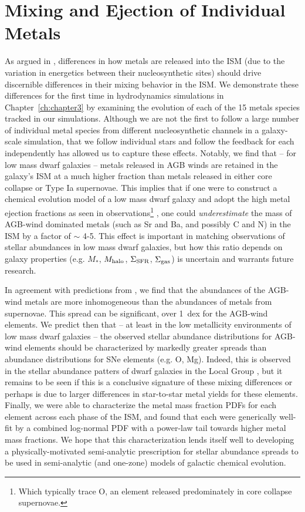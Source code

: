 \section{Mixing and Ejection of Individual Metals}
\label{conclusion:sec:ch3}

As argued in \cite{KrumholzTing2018}, differences in how metals are released into the ISM (due to the variation in energetics between their nucleosynthetic sites) should drive discernible differences in their mixing behavior in the ISM. We demonstrate these differences for the first time in hydrodynamics simulations in Chapter~\ref{ch:chapter3} by examining the evolution of each of the 15 metals species tracked in our simulations. Although we are not the first to follow a large number of individual metal species from different nucleosynthetic channels in a galaxy-scale simulation, that we follow individual stars and follow the feedback for each independently has allowed us to capture these effects. Notably, we find that -- for low mass dwarf galaxies -- metals released in AGB winds are retained in the galaxy's ISM at a much higher fraction than metals released in either core collapse or Type Ia supernovae. This implies that if one were to construct a chemical evolution model of a low mass dwarf galaxy and adopt the high metal ejection fractions as seen in observations\footnote{Which typically trace O, an element released predominately in core collapse supernovae.} \citep{Kirby2011-metals,McQuinn2015}, one could \textit{underestimate} the mass of AGB-wind dominated metals (such as Sr and Ba, and possibly C and N) in the ISM by a factor of $\sim$ 4-5. This effect is important in matching observations of stellar abundances in low mass dwarf galaxies, but how this ratio depends on galaxy properties (e.g. $M_*$, $M_{\rm halo}$, $\Sigma_{\rm SFR}$, $\Sigma_{\rm gas}$) is uncertain and warrants future research.

In agreement with predictions from \cite{KrumholzTing2018}, we find that the abundances of the AGB-wind metals are more inhomogeneous than the abundances of metals from supernovae. This spread can be significant, over 1~dex for the AGB-wind elements. We predict then that -- at least in the low metallicity environments of low mass dwarf galaxies -- the observed stellar abundance distributions for AGB-wind elements should be characterized by markedly greater spreads than abundance distributions for SNe elements (e.g. O, Mg). Indeed, this is observed in the stellar abundance patters of dwarf galaxies in the Local Group \citep{Suda2017}, but it remains to be seen if this is a conclusive signature of these mixing differences or perhaps is due to larger differences in star-to-star metal yields for these elements. Finally, we were able to characterize the metal mass fraction PDFs for each element across each phase of the ISM, and found that each were generically well-fit by a combined log-normal PDF with a power-law tail towards higher metal mass fractions. We hope that this characterization lends itself well to developing a physically-motivated semi-analytic prescription for stellar abundance spreads to be used in semi-analytic (and one-zone) models of galactic chemical evolution.

